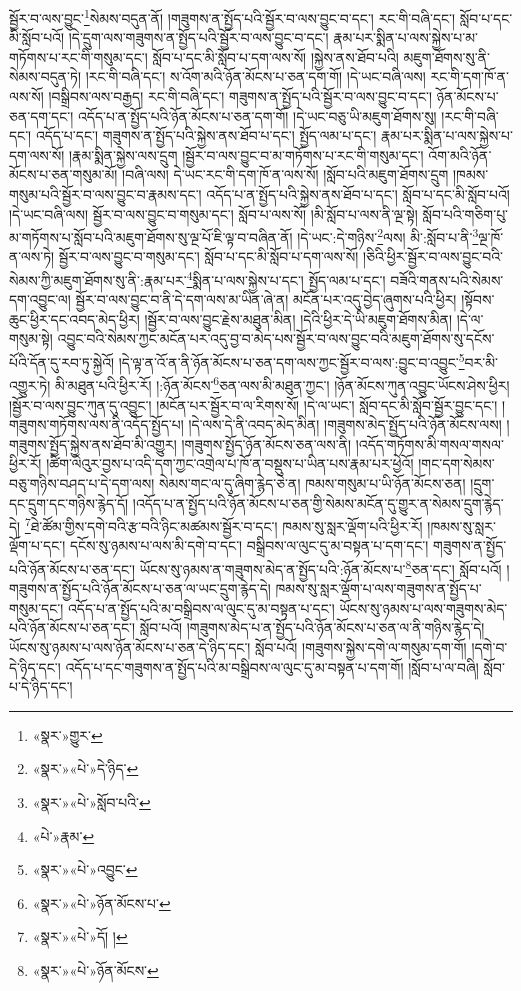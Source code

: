 སྦྱོར་བ་ལས་བྱུང་\footnote{«སྣར་»གྱུར་}སེམས་བདུན་ནོ། །གཟུགས་ན་སྤྱོད་པའི་སྦྱོར་བ་ལས་བྱུང་བ་དང་། རང་གི་བཞི་དང་། སློབ་པ་དང་མི་སློབ་པའོ། །དེ་དྲུག་ལས་གཟུགས་ན་སྤྱོད་པའི་སྦྱོར་བ་ལས་བྱུང་བ་དང་། རྣམ་པར་སྨིན་པ་ལས་སྐྱེས་པ་མ་གཏོགས་པ་རང་གི་གསུམ་དང་། སློབ་པ་དང་མི་སློབ་པ་དག་ལས་སོ། །སྐྱེས་ནས་ཐོབ་པའི། མཇུག་ཐོགས་སུ་ནི་སེམས་བདུན་ཏེ། །རང་གི་བཞི་དང་། ས་འོག་མའི་ཉོན་མོངས་པ་ཅན་དག་གོ། །དེ་ཡང་བཞི་ལས། རང་གི་དག་ཁོ་ན་ལས་སོ། །བསྒྲིབས་ལས་བརྒྱད། རང་གི་བཞི་དང་། གཟུགས་ན་སྤྱོད་པའི་སྦྱོར་བ་ལས་བྱུང་བ་དང་། ཉོན་མོངས་པ་ཅན་དག་དང་། འདོད་པ་ན་སྤྱོད་པའི་ཉོན་མོངས་པ་ཅན་དག་གོ། །དེ་ཡང་བཅུ་ཡི་མཇུག་ཐོགས་སུ། །རང་གི་བཞི་དང་། འདོད་པ་དང་། གཟུགས་ན་སྤྱོད་པའི་སྐྱེས་ནས་ཐོབ་པ་དང་། སྤྱོད་ལམ་པ་དང་། རྣམ་པར་སྨིན་པ་ལས་སྐྱེས་པ་དག་ལས་སོ། །རྣམ་སྨིན་སྐྱེས་ལས་དྲུག །སྦྱོར་བ་ལས་བྱུང་བ་མ་གཏོགས་པ་རང་གི་གསུམ་དང་། འོག་མའི་ཉོན་མོངས་པ་ཅན་གསུམ་མོ། །བཞི་ལས། དེ་ཡང་རང་གི་དག་ཁོ་ན་ལས་སོ། །སློབ་པའི་མཇུག་ཐོགས་དྲུག །ཁམས་གསུམ་པའི་སྦྱོར་བ་ལས་བྱུང་བ་རྣམས་དང་། འདོད་པ་ན་སྤྱོད་པའི་སྐྱེས་ནས་ཐོབ་པ་དང་། སློབ་པ་དང་མི་སློབ་པའོ། །དེ་ཡང་བཞི་ལས། སྦྱོར་བ་ལས་བྱུང་བ་གསུམ་དང་། སློབ་པ་ལས་སོ། །མི་སློབ་པ་ལས་ནི་ལྔ་སྟེ། སློབ་པའི་གཅིག་པུ་མ་གཏོགས་པ་སློབ་པའི་མཇུག་ཐོགས་སུ་ལྔ་པོ་ཇི་ལྟ་བ་བཞིན་ནོ། །དེ་ཡང་:དེ་གཉིས་\footnote{«སྣར་»«པེ་»དེ་ཉིད་}ལས། མི་:སློབ་པ་ནི་\footnote{«སྣར་»«པེ་»སློབ་པའི་}ལྔ་ཁོ་ན་ལས་ཏེ། སྦྱོར་བ་ལས་བྱུང་བ་གསུམ་དང་། སློབ་པ་དང་མི་སློབ་པ་དག་ལས་སོ། །ཅིའི་ཕྱིར་སྦྱོར་བ་ལས་བྱུང་བའི་སེམས་ཀྱི་མཇུག་ཐོགས་སུ་ནི་:རྣམ་པར་\footnote{«པེ་»རྣམ་}སྨིན་པ་ལས་སྐྱེས་པ་དང་། སྤྱོད་ལམ་པ་དང་། བཟོའི་གནས་པའི་སེམས་དག་འབྱུང་ལ། སྦྱོར་བ་ལས་བྱུང་བ་ནི་དེ་དག་ལས་མ་ཡིན་ཞེ་ན། མངོན་པར་འདུ་བྱེད་ཞུགས་པའི་ཕྱིར། །སྟོབས་ཆུང་ཕྱིར་དང་འབད་མེད་ཕྱིར། །སྦྱོར་བ་ལས་བྱུང་རྗེས་མཐུན་མིན། །དེའི་ཕྱིར་དེ་ཡི་མཇུག་ཐོགས་མིན། །དེ་ལ་གསུམ་སྟེ། འབྱུང་བའི་སེམས་ཀྱང་མངོན་པར་འདུ་བྱ་བ་མེད་པས་སྦྱོར་བ་ལས་བྱུང་བའི་མཇུག་ཐོགས་སུ་དངོས་པོའི་དོན་དུ་རབ་ཏུ་སྐྱེའོ། །དེ་ལྟ་ན་འོ་ན་ནི་ཉོན་མོངས་པ་ཅན་དག་ལས་ཀྱང་སྦྱོར་བ་ལས་:བྱུང་བ་འབྱུང་\footnote{«སྣར་»«པེ་»འབྱུང་}བར་མི་འགྱུར་ཏེ། མི་མཐུན་པའི་ཕྱིར་རོ། །:ཉོན་མོངས་\footnote{«སྣར་»«པེ་»ཉོན་མོངས་པ་}ཅན་ལས་མི་མཐུན་ཀྱང་། །ཉོན་མོངས་ཀུན་འབྱུང་ཡོངས་ཤེས་ཕྱིར། །སྦྱོར་བ་ལས་བྱུང་ཀུན་དུ་འབྱུང་། །མངོན་པར་སྦྱོར་བ་ལ་རིགས་སོ། །དེ་ལ་ཡང་། སློབ་དང་མི་སློབ་སྦྱོར་བྱུང་དང་། །གཟུགས་གཏོགས་ལས་ནི་འདོད་སྤྱོད་པ། །དེ་ལས་དེ་ནི་འབད་མེད་མིན། །གཟུགས་མེད་སྤྱོད་པའི་ཉོན་མོངས་ལས། །གཟུགས་སྤྱོད་སྐྱེས་ནས་ཐོབ་མི་འགྱུར། །གཟུགས་སྤྱོད་ཉོན་མོངས་ཅན་ལས་ནི། །འདོད་གཏོགས་མི་གསལ་གསལ་ཕྱིར་རོ། །ཚིག་ལེའུར་བྱས་པ་འདི་དག་ཀྱང་འགྲེལ་པ་ཁོ་ན་བསྡུས་པ་ཡིན་པས་རྣམ་པར་ཕྱེའོ། །གང་དག་སེམས་བཅུ་གཉིས་བཤད་པ་དེ་དག་ལས། སེམས་གང་ལ་དུ་ཞིག་རྙེད་ཅེ་ན། ཁམས་གསུམ་པ་ཡི་ཉོན་མོངས་ཅན། །དྲུག་དང་དྲུག་དང་གཉིས་རྙེད་དོ། །འདོད་པ་ན་སྤྱོད་པའི་ཉོན་མོངས་པ་ཅན་གྱི་སེམས་མངོན་དུ་གྱུར་ན་སེམས་དྲུག་རྙེད་དེ། \footnote{«སྣར་»«པེ་»དོ། ། }ཐེ་ཚོམ་གྱིས་དགེ་བའི་རྩ་བའི་ཉིང་མཚམས་སྦྱོར་བ་དང་། ཁམས་སུ་སླར་ལྡོག་པའི་ཕྱིར་རོ། །ཁམས་སུ་སླར་ལྡོག་པ་དང་། དངོས་སུ་ཉམས་པ་ལས་མི་དགེ་བ་དང་། བསྒྲིབས་ལ་ལུང་དུ་མ་བསྟན་པ་དག་དང་། གཟུགས་ན་སྤྱོད་པའི་ཉོན་མོངས་པ་ཅན་དང་། ཡོངས་སུ་ཉམས་ན་གཟུགས་མེད་ན་སྤྱོད་པའི་:ཉོན་མོངས་པ་\footnote{«སྣར་»«པེ་»ཉོན་མོངས་}ཅན་དང་། སློབ་པའོ། །གཟུགས་ན་སྤྱོད་པའི་ཉོན་མོངས་པ་ཅན་ལ་ཡང་དྲུག་རྙེད་དེ། ཁམས་སུ་སླར་ལྡོག་པ་ལས་གཟུགས་ན་སྤྱོད་པ་གསུམ་དང་། འདོད་པ་ན་སྤྱོད་པའི་མ་བསྒྲིབས་ལ་ལུང་དུ་མ་བསྟན་པ་དང་། ཡོངས་སུ་ཉམས་པ་ལས་གཟུགས་མེད་པའི་ཉོན་མོངས་པ་ཅན་དང་། སློབ་པའོ། །གཟུགས་མེད་པ་ན་སྤྱོད་པའི་ཉོན་མོངས་པ་ཅན་ལ་ནི་གཉིས་རྙེད་དེ། ཡོངས་སུ་ཉམས་པ་ལས་ཉོན་མོངས་པ་ཅན་དེ་ཉིད་དང་། སློབ་པའོ། །གཟུགས་སྐྱེས་དགེ་ལ་གསུམ་དག་གོ། །དགེ་བ་དེ་ཉིད་དང་། འདོད་པ་དང་གཟུགས་ན་སྤྱོད་པའི་མ་བསྒྲིབས་ལ་ལུང་དུ་མ་བསྟན་པ་དག་གོ། །སློབ་པ་ལ་བཞི། སློབ་པ་དེ་ཉིད་དང་། 